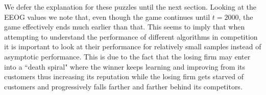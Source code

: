 \documentclass[../competing_bandits.tex]{subfiles}
\begin{document}

We defer the explanation for these puzzles until the next section. Looking at the EEOG values we note that, even though the game continues until $t=2000$, the game effectively ends much earlier than that. This seems to imply that when attempting to understand the performance of different algorithms in competition it is important to look at their performance for relatively small samples instead of asymptotic performance. This is due to the fact that the losing firm may enter into a ``death spiral" where the winner keeps learning and improving from its customers thus increasing its reputation while the losing firm gets starved of customers and progressively falls farther and farther behind its competitors.
\end{document}
